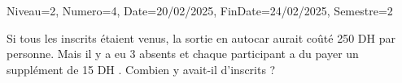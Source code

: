 \documentclass[a4paper,12pt]{article}
\begin{document}
\begin{Maquette}[DM]{Niveau=2, Numero=4, Date=20/02/2025, FinDate=24/02/2025, Semestre=2}
\begin{exercice}
Si tous les inscrits étaient venus, la sortie en autocar aurait coûté 250 DH par personne. Mais il y a eu 3 absents et chaque participant a du payer un supplément de 15 DH . Combien y avait-il d'inscrits ?
\end{exercice}
\end{Maquette}
\end{document}
